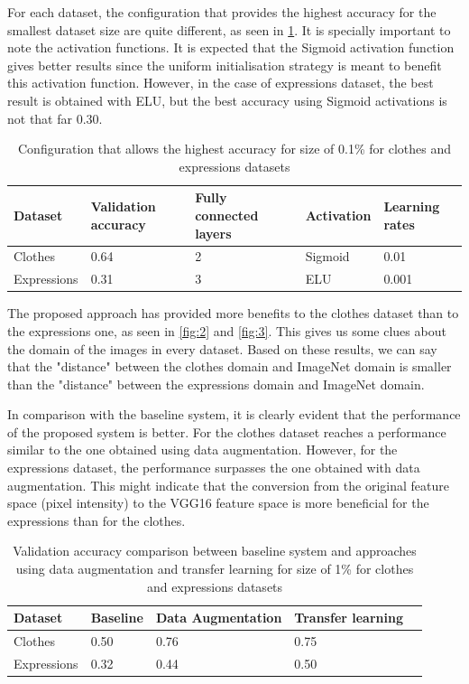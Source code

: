 \documentclass{article}
\begin{document}
For each dataset, the configuration that provides the highest accuracy for the smallest dataset size are quite different, as seen in \ref{tab:1}. It is specially important to note the activation functions. It is expected that the Sigmoid activation function gives better results since the uniform initialisation strategy is meant to benefit this activation function. However, in the case of expressions dataset, the best result is obtained with ELU, but the best accuracy using Sigmoid activations is not that far 0.30.

\begin{table}[!htb]
  \centering
  \begin{tabular}{| l | l | l | l | l |}
    \hline
    \textbf{Dataset} & \textbf{Validation accuracy} & \textbf{Fully connected layers}& \textbf{Activation} & \textbf{Learning rates}\\ \hline
    Clothes & 0.64 & 2 & Sigmoid & 0.01 \\ \hline
    Expressions & 0.31  & 3 & ELU & 0.001 \\ \hline
  \end{tabular}
  \caption{Configuration that allows the highest accuracy for size of 0.1\% for clothes and expressions datasets}
  \label{tab:1}
\end{table}

The proposed approach has provided more benefits to the clothes dataset than to the expressions one, as seen in \ref{fig:2} and \ref{fig:3}. This gives us some clues about the domain of the images in every dataset. Based on these results, we can say that the "distance" between the clothes domain and ImageNet domain is smaller than the "distance" between the expressions domain and ImageNet domain.

In comparison with the baseline system, it is clearly evident that the performance of the proposed system is better. For the clothes dataset reaches a performance similar to the one obtained using data augmentation. However, for the expressions dataset, the performance surpasses the one obtained with data augmentation. This might indicate that the conversion from the original feature space (pixel intensity) to the VGG16 feature space is more beneficial for the expressions than for the clothes.

\begin{table}[!htb]
  \centering
  \begin{tabular}{| l | l | l | l | l |}
    \hline
    \textbf{Dataset} & \textbf{Baseline} & \textbf{Data Augmentation}& \textbf{Transfer learning} \\ \hline
    Clothes & 0.50 & 0.76 & 0.75 \\ \hline
    Expressions & 0.32  & 0.44 & 0.50 \\ \hline
  \end{tabular}
  \caption{Validation accuracy comparison between baseline system and approaches using data augmentation and transfer learning for size of 1\% for clothes and expressions datasets}
  \label{tab:2}
\end{table}
\end{document}
